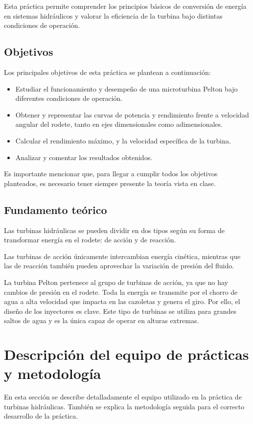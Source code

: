 \documentclass[10pt]{IEEEtran}
\begin{document}
Esta práctica permite comprender los principios básicos de conversión de energía en sistemas hidráulicos y valorar la eficiencia de la turbina bajo distintas condiciones de operación.

\subsection{Objetivos}
Los principales objetivos de esta práctica se plantean a continuación:
\begin{itemize}
  \item Estudiar el funcionamiento y desempeño de una microturbina Pelton bajo diferentes condiciones de operación.
  \item Obtener y representar las curvas de potencia y rendimiento frente a velocidad angular del rodete, tanto en ejes dimensionales como adimensionales.
  \item Calcular el rendimiento máximo, y la velocidad específica de la turbina.
  \item Analizar y comentar los resultados obtenidos.
\end{itemize}

Es importante mencionar que, para llegar a cumplir todos los objetivos planteados, es necesario tener siempre presente la teoría vista en clase.

\subsection{Fundamento teórico}
Las turbinas hidráulicas se pueden dividir en dos tipos según su forma de transformar energía en el rodete: de acción y de reacción.

Las turbinas de acción únicamente intercambian energía cinética, mientras que las de reacción también pueden aprovechar la variación de presión del fluido.

La turbina Pelton pertenece al grupo de turbinas de acción, ya que no hay cambios de presión en el rodete. Toda la energía se transmite por el chorro de agua a alta velocidad que impacta en las cazoletas y genera el giro. Por ello, el diseño de los inyectores es clave. Este tipo de turbinas se utiliza para grandes saltos de agua y es la única capaz de operar en alturas extremas.

\section{Descripción del equipo de prácticas y metodología}
En esta sección se describe detalladamente el equipo utilizado en la práctica de turbinas hidráulicas. También se explica la metodología seguida para el correcto desarrollo de la práctica.
\end{document}
